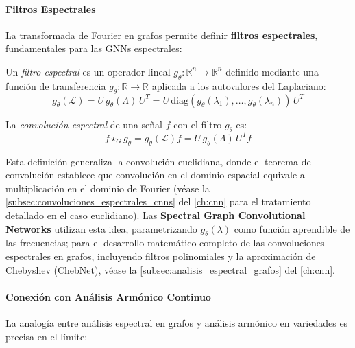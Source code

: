 \paragraph{Filtros Espectrales}

La transformada de Fourier en grafos permite definir \textbf{filtros espectrales}, fundamentales para las \glspl{GNN} espectrales:

\begin{definition}\label{def:filtro_espectral_grafo}
	Un \textit{filtro espectral} es un operador lineal $g_\theta: \mathbb{R}^n \to \mathbb{R}^n$ definido mediante una función de transferencia $g_\theta: \mathbb{R} \to \mathbb{R}$ aplicada a los autovalores del Laplaciano:
	\[
		g_\theta(\mathcal{L}) = U \, g_\theta(\Lambda) \, U^T = U \, \text{diag}(g_\theta(\lambda_1), \ldots, g_\theta(\lambda_n)) \, U^T
	\]

	La \textit{convolución espectral} de una señal $f$ con el filtro $g_\theta$ es:
	\[
		f \star_G g_\theta = g_\theta(\mathcal{L}) f = U \, g_\theta(\Lambda) \, U^T f
	\]
\end{definition}

Esta definición generaliza la convolución euclidiana, donde el teorema de convolución establece que convolución en el dominio espacial equivale a multiplicación en el dominio de Fourier (véase la \autoref{subsec:convoluciones_espectrales_cnns} del \autoref{ch:cnn} para el tratamiento detallado en el caso euclidiano). Las \textbf{Spectral Graph Convolutional Networks} \citep{bruna2014spectralnetworkslocallyconnected} utilizan esta idea, parametrizando $g_\theta(\lambda)$ como función aprendible de las frecuencias; para el desarrollo matemático completo de las convoluciones espectrales en grafos, incluyendo filtros polinomiales y la aproximación de Chebyshev (ChebNet), véase la \autoref{subsec:analisis_espectral_grafos} del \autoref{ch:cnn}.

\paragraph{Conexión con Análisis Armónico Continuo}

La analogía entre análisis espectral en grafos y análisis armónico en variedades es precisa en el límite:

